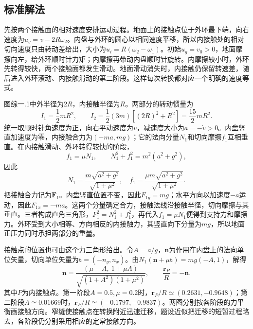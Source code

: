 \documentclass[UTF8,fontset=fandol,a4paper,11pt]{ctexart}
\begin{document}


\subsection*{标准解法}


先按两个接触面的相对速度安排运动过程。地面上的接触点位于外环最下端，向右速度为$u_g=v-2R\omega_2$。内盘与外环的圆心以相同速度平移，所以内接触处的相对切向速度只由转动差给出，大小为$u_i=R(\omega_2-\omega_1)$。初始$u_g=v_0>0$，地面摩擦向左，给外环顺时针力矩；内摩擦再带动内盘顺时针旋转。内摩擦较小时，外环先转得较快，两个接触面都发生滑动。地面滑动消失时，内接触仍保留转速差，随后进入外环滚动、内接触滑动的第二阶段。这样每次转换都对应一个明确的速度等式。

图综一.1中外半径为$2R$，内接触半径为$R$。两部分的转动惯量为
\[
I_1=\frac12mR^2,\qquad
I_2=\frac12(3m)[(2R)^2+R^2]=\frac{15}2mR^2.
\]
统一取顺时针角速度为正，向右平动速度为$v$，减速度大小为$a=-\dot v>0$。内盘竖直加速度为零，内接触合力为$(-ma,mg)$；它的法向分量$N_1$和切向摩擦$f_1$互相垂直。在内接触滑动、外环转得较快的阶段，
\[
f_1=\mu N_1,\qquad N_1^2+f_1^2=m^2(a^2+g^2),
\]
因此
\[
\boxed{N_1=\frac{m\sqrt{a^2+g^2}}{\sqrt{1+\mu^2}},
\quad f_1=\frac{\mu m\sqrt{a^2+g^2}}{\sqrt{1+\mu^2}}}.
\]
把接触合力记为$\boldsymbol F_1$。内盘竖直位置不变，因此$F_{1y}=mg$；水平方向以加速度$-a$运动，因此$F_{1x}=-ma$。这两个分量确定合力，接触法线沿接触半径，切向摩擦与其垂直。三者构成直角三角形，$F_1^2=N_1^2+f_1^2$，再代入$f_1=\mu N_1$便得到支持力和摩擦力。外环受到大小相等、方向相反的内接触力，其竖直向下分量为$mg$，所以地面正压力同时承担两部分的重量。

接触点的位置也可由这个力三角形给出。令$A=a/g$，$\boldsymbol n$为作用在内盘上的法向单位矢量，切向单位矢量为$\boldsymbol t=(-n_y,n_x)$。由$N_1(\boldsymbol n+\mu\boldsymbol t)=mg(-A,1)$，解得
\[
\boldsymbol n=\frac{(\mu-A,\ 1+\mu A)}{\sqrt{(1+A^2)(1+\mu^2)}},\qquad
\frac{\boldsymbol r_P}{R}=-\boldsymbol n.
\]
其中$P$为内接触点。第一阶段$A=0.5,\mu=0.2$时，$\boldsymbol r_P/R\simeq(0.2631,-0.9648)$；第二阶段$A\simeq0.01669$时，$\boldsymbol r_P/R\simeq(-0.1797,-0.9837)$。两图分别按各阶段的力平衡画接触方向。窄缝使接触点在转换附近迅速迁移，题设近似把迁移的短暂过程略去，各阶段仍分别采用相应的定常接触方向。
\end{document}
